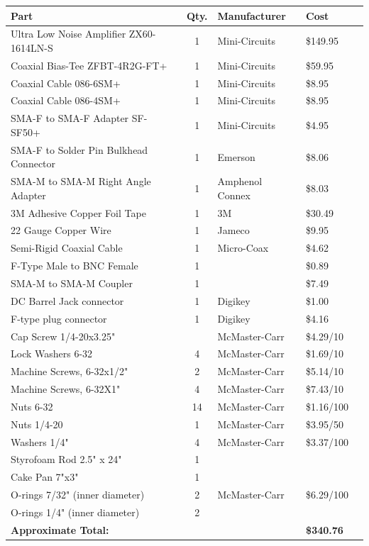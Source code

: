 \documentclass[11pt]{article} %
\begin{document}
\begin{tabular}{| p{6cm} | c | p{5cm} | l | c |}
\hline
\textbf{Part} & \textbf{Qty.} & \textbf{Manufacturer} & \textbf{Cost} \\ \hline \hline
Ultra Low Noise Amplifier ZX60-1614LN-S & 1 & Mini-Circuits & \$149.95 \\ \hline
Coaxial Bias-Tee ZFBT-4R2G-FT+& 1 & Mini-Circuits & \$59.95 \\ \hline
Coaxial Cable 086-6SM+ & 1 & Mini-Circuits & \$8.95 \\ \hline
Coaxial Cable 086-4SM+ & 1 & Mini-Circuits & \$8.95 \\ \hline
SMA-F to SMA-F Adapter SF-SF50+ & 1 & Mini-Circuits & \$4.95 \\ \hline
SMA-F to Solder Pin Bulkhead Connector & 1 & Emerson & \$8.06 \\ \hline
SMA-M to SMA-M Right Angle Adapter & 1 & Amphenol Connex & \$8.03 \\ \hline
3M Adhesive Copper Foil Tape & 1 & 3M & \$30.49 \\ \hline
22 Gauge Copper Wire & 1 & Jameco & \$9.95 \\ \hline
Semi-Rigid Coaxial Cable & 1 & Micro-Coax & \$4.62 \\ \hline
F-Type Male to BNC Female & 1 & & \$0.89 \\ \hline
SMA-M to SMA-M Coupler & 1 & & \$7.49\\ \hline
DC Barrel Jack connector & 1 & Digikey & \$1.00  \\ \hline
F-type plug connector & 1& Digikey & \$4.16  \\ \hline
Cap Screw 1/4-20x3.25" & & McMaster-Carr & \$4.29/10 \\ \hline 
Lock Washers 6-32 & 4 & McMaster-Carr & \$1.69/10 \\ \hline
Machine Screws, 6-32x1/2" & 2 & McMaster-Carr & \$5.14/10 \\ \hline
Machine Screws, 6-32X1" & 4 & McMaster-Carr & \$7.43/10 \\ \hline
Nuts 6-32 & 14 & McMaster-Carr & \$1.16/100 \\ \hline
Nuts 1/4-20 & 1 & McMaster-Carr & \$3.95/50 \\ \hline
Washers 1/4" & 4 & McMaster-Carr & \$3.37/100 \\ \hline
Styrofoam Rod 2.5" x 24" & 1 & & \\ \hline
Cake Pan 7"x3" & 1 & & \\ \hline
O-rings 7/32" (inner diameter) & 2 & McMaster-Carr & \$6.29/100 \\ \hline
O-rings 1/4" (inner diameter) & 2 & & \\ \hline
\textbf{Approximate Total:} & & & \textbf{\$340.76} \\ \hline
\end{tabular}
\end{document}
